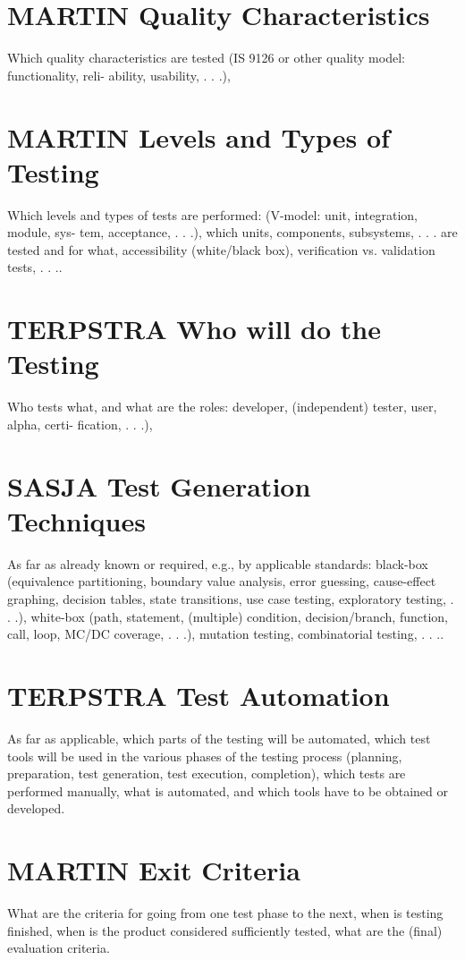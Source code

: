 \documentclass[11pt,a4paper]{article}
\begin{document}
\section{MARTIN Quality Characteristics}
Which quality characteristics are tested (IS 9126 or other quality model: functionality, reli-
ability, usability, . . .),
\section{MARTIN Levels and Types of Testing}
Which levels and types of tests are performed: (V-model: unit, integration, module, sys-
tem, acceptance, . . .), which units, components, subsystems, . . . are tested and for what,
accessibility (white/black box), verification vs. validation tests, . . ..
\section{TERPSTRA Who will do the Testing}
Who tests what, and what are the roles: developer, (independent) tester, user, alpha, certi-
fication, . . .),
\section{SASJA Test Generation Techniques}
As far as already known or required, e.g., by applicable standards: black-box (equivalence
partitioning, boundary value analysis, error guessing, cause-effect graphing, decision tables,
state transitions, use case testing, exploratory testing, . . .), white-box (path, statement,
(multiple) condition, decision/branch, function, call, loop, MC/DC coverage, . . .), mutation
testing, combinatorial testing, . . ..
\section{TERPSTRA Test Automation}
As far as applicable, which parts of the testing will be automated, which test tools will be
used in the various phases of the testing process (planning, preparation, test generation, test
execution, completion), which tests are performed manually, what is automated, and which
tools have to be obtained or developed.
\section{MARTIN Exit Criteria}
What are the criteria for going from one test phase to the next, when is testing finished,
when is the product considered sufficiently tested, what are the (final) evaluation criteria.
\end{document}
